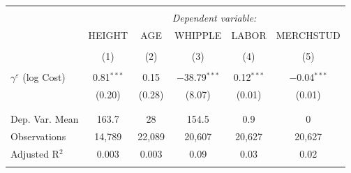 
\begin{tabular}{@{\extracolsep{5pt}}lccccc} 
\\[-1.8ex]\hline 
\hline \\[-1.8ex] 
 & \multicolumn{5}{c}{\textit{Dependent variable:}} \\ 
\cline{2-6} 
 & HEIGHT & AGE & WHIPPLE & LABOR & MERCHSTUD \\ 
\\[-1.8ex] & (1) & (2) & (3) & (4) & (5)\\ 
\hline \\[-1.8ex] 
 $\gamma^{\varepsilon}$ (log Cost) & 0.81$^{***}$ & 0.15 & $-$38.79$^{***}$ & 0.12$^{***}$ & $-$0.04$^{***}$ \\ 
  & (0.20) & (0.28) & (8.07) & (0.01) & (0.01) \\ 
  & & & & & \\ 
\hline \\[-1.8ex] 
Dep. Var. Mean & 163.7 & 28 & 154.5 & 0.9 & 0 \\ 
Observations & 14,789 & 22,089 & 20,607 & 20,627 & 20,627 \\ 
Adjusted R$^{2}$ & 0.003 & 0.003 & 0.09 & 0.03 & 0.02 \\ 
\hline 
\hline \\[-1.8ex] 
\end{tabular} 
